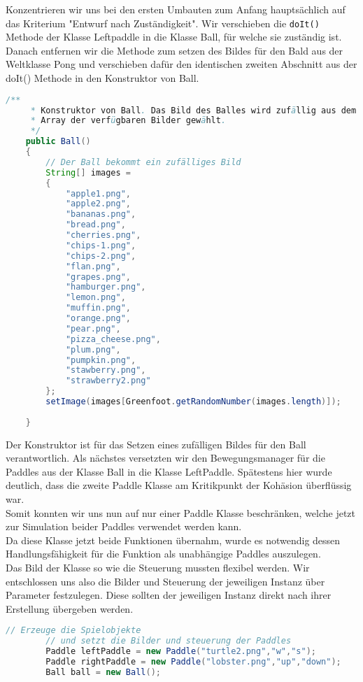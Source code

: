 \documentclass{pi1}
\begin{document}
Konzentrieren wir uns bei den ersten Umbauten zum Anfang hauptsächlich auf das Kriterium "Entwurf nach Zuständigkeit".\newline
Wir verschieben die \texttt{doIt()} Methode der Klasse Leftpaddle in die Klasse Ball, für welche sie zuständig ist. Danach entfernen wir die Methode zum setzen des Bildes für den Bald aus der Weltklasse Pong und verschieben dafür den identischen zweiten Abschnitt aus der doIt() Methode in den Konstruktor von Ball.
\begin{lstlisting}[caption={Konstruktor von Ball}, firstnumber=17, language=Java]
/**
     * Konstruktor von Ball. Das Bild des Balles wird zufällig aus dem
     * Array der verfügbaren Bilder gewählt.
     */
    public Ball()
    {
        // Der Ball bekommt ein zufälliges Bild
        String[] images =
        {
            "apple1.png",
            "apple2.png",
            "bananas.png",
            "bread.png",
            "cherries.png",
            "chips-1.png",
            "chips-2.png",
            "flan.png",
            "grapes.png",
            "hamburger.png",
            "lemon.png",
            "muffin.png",
            "orange.png",
            "pear.png",
            "pizza_cheese.png",
            "plum.png",
            "pumpkin.png",
            "stawberry.png",
            "strawberry2.png"
        };
        setImage(images[Greenfoot.getRandomNumber(images.length)]);
    
    }
\end{lstlisting}

Der Konstruktor ist für das Setzen eines zufälligen Bildes für den Ball verantwortlich.
Als nächstes versetzten wir den Bewegungsmanager für die Paddles aus der Klasse Ball in die Klasse LeftPaddle. Spätestens hier wurde deutlich, dass die zweite Paddle Klasse am Kritikpunkt der Kohäsion überflüssig war.\\
Somit konnten wir uns nun auf nur einer Paddle Klasse beschränken, welche jetzt zur Simulation beider Paddles verwendet werden kann.\\

Da diese Klasse jetzt beide Funktionen übernahm, wurde es notwendig dessen Handlungsfähigkeit für die Funktion als unabhängige Paddles auszulegen.
\\
Das Bild der Klasse so wie die Steuerung mussten flexibel werden.
Wir entschlossen uns also die Bilder und Steuerung der jeweiligen Instanz über Parameter festzulegen. Diese sollten der jeweiligen Instanz direkt nach ihrer Erstellung übergeben werden.
\begin{lstlisting}[caption={ausschnitt der Welt-Klasse Pong}, firstnumber=17, language=Java]
// Erzeuge die Spielobjekte
        // und setzt die Bilder und steuerung der Paddles
        Paddle leftPaddle = new Paddle("turtle2.png","w","s");
        Paddle rightPaddle = new Paddle("lobster.png","up","down");
        Ball ball = new Ball();
    
\end{lstlisting}
\end{document}
